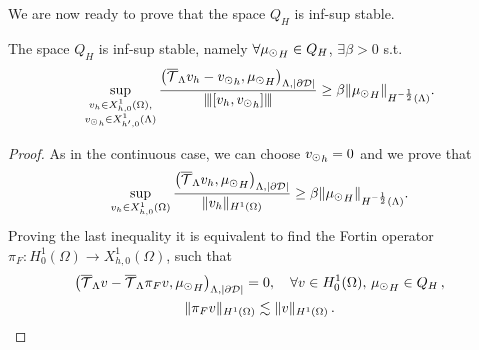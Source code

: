 We are now ready to prove that the space $Q_H$ is inf-sup stable. 
\begin{lemma}\label{lemma:Lh_infsup}
The space $Q_H$ is inf-sup stable, namely $\forall {\mu_{\odot}}_H \in Q_H$, $\exists \beta >0$ s.t.
\begin{equation*}
\sup_{\substack{v_h \in X_{h,0}^1(\Omega),\\ {v_{\odot}}_h \in X_{h',0}^1(\Lambda)}} \frac{\left({\overline{\mathcal{T}}_\Lambda} v_h - {v_{\odot}}_h, {\mu_{\odot}} _H\right)_{\Lambda, |\partial\mathcal{D}|}}{{\left\vert\kern-0.25ex\left\vert\kern-0.25ex\left\vert [v_h, {v_{\odot}}_h] \right\vert\kern-0.25ex\right\vert\kern-0.25ex\right\vert}} \geq \beta \|{\mu_{\odot}}_H\|_{H^{-\frac 12}(\Lambda)}.
\end{equation*} 
\end{lemma}

\begin{proof}
As in the continuous case, we can choose ${v_{\odot}}_h=0$ and we prove that
\begin{equation*} 
\sup_{v_h \in X_{h,0}^1(\Omega)} \frac{\left({\overline{\mathcal{T}}_\Lambda} v_h ,{\mu_{\odot}}_H\right)_{\Lambda, |\partial\mathcal{D}|}}{\|v_h\|_{H^1(\Omega)}} \geq \beta \|{\mu_{\odot}}_H\|_{H^{-\frac 12}(\Lambda)}.
\end{equation*} 
Proving the last inequality it is equivalent to find the Fortin operator $\pi_F: H^1_0(\Omega) \rightarrow X_{h,0}^1(\Omega)$, such that 
\begin{gather}
\left(\mtrace v - \mtrace \pi _F v  , {\md}_H\right)_{\Lambda, |\DD|}=0, \quad \forall v\in H^1_0(\Omega), \, {\md}_H \in Q_H\,,
\\
\label{eq:cont_Fortin}
\|\pi_F v\|_{H^1(\Omega)}\lesssim \|v\|_{H^1(\Omega)}\,.
\end{gather} 


\end{proof}
